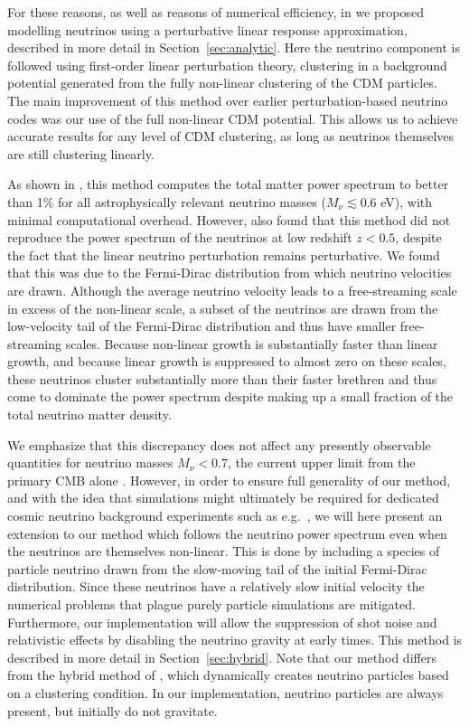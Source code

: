 \documentclass[useAMS, usenatbib]{mnras}
\begin{document}
For these reasons, as well as reasons of numerical efficiency, in \cite{AHB} we proposed modelling neutrinos using a perturbative linear response approximation, described in more detail in Section~\ref{sec:analytic}. Here the neutrino component is followed using first-order linear perturbation theory, clustering in a background potential generated from the fully non-linear clustering of the CDM particles. The main improvement of this method over earlier perturbation-based neutrino codes \citep{Brandbyge_2009} was our use of the full non-linear CDM potential. This allows us
to achieve accurate results for any level of CDM clustering, as long as neutrinos themselves are still
clustering linearly.

As shown in \cite{AHB}, this method computes the total matter power spectrum to better
than 1\% for all astrophysically relevant neutrino masses ($M_\nu \lesssim 0.6$ eV), with minimal
computational overhead. However, \citep{AHB} also found that this method did not reproduce the
power spectrum of the neutrinos at low redshift $z < 0.5$, despite the fact that the linear neutrino perturbation remains perturbative. We found that this was due to the Fermi-Dirac distribution from which neutrino velocities are drawn. Although the average neutrino velocity leads to a free-streaming scale in excess of the non-linear scale, a subset of the neutrinos are drawn from the low-velocity tail of the Fermi-Dirac distribution and thus have smaller free-streaming scales. Because non-linear growth is substantially faster than linear growth, and because linear growth is suppressed to almost zero on these scales, these neutrinos cluster substantially more than their faster brethren and thus come to dominate the power spectrum despite making up a small fraction of the total neutrino matter density.

We emphasize that this discrepancy does not affect any presently observable quantities for neutrino masses $M_\nu < 0.7$, the current upper limit from the primary CMB alone \cite{Planck_2015}. However, in order to ensure full generality of our method, and with the idea that simulations might ultimately be required for dedicated cosmic neutrino background experiments such as e.g.~\citep{Ptolemy}, we will here present an extension to our method which follows the neutrino power spectrum even when the neutrinos are themselves non-linear. This is done by including a species of particle neutrino drawn from the slow-moving tail of the initial Fermi-Dirac distribution. Since these neutrinos have a relatively slow initial velocity the numerical problems that plague purely particle simulations are mitigated.
Furthermore, our implementation will allow the suppression of shot noise and relativistic effects by disabling the neutrino gravity at early times. This method is described in more detail in Section~\ref{sec:hybrid}. Note that our method differs from the hybrid method of \cite{Brandbyge_2010}, which dynamically creates neutrino particles based on a clustering condition. In our implementation, neutrino particles are always present, but initially do not gravitate.
\end{document}
